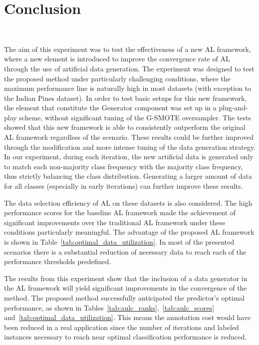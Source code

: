 \documentclass[preprint,12pt]{elsarticle}
\begin{document}
\section{Conclusion}~\label{sec:conclusion}

The aim of this experiment was to test the effectiveness of a new AL
framework, where a new element is introduced to improve the convergence rate
of AL through the use of artificial data generation. The experiment was
designed to test the proposed method under particularly challenging
conditions, where the maximum performance line is naturally high in most
datasets (with exception to the Indian Pines dataset). In order to test basic
setups for this new framework, the element that constitute the Generator
component was set up in a plug-and-play scheme, without significant tuning of
the G-SMOTE oversampler. The tests showed that this new framework is able to
consistently outperform the original AL framework regardless of the scenario.
These results could be further improved through the modification and more
intense tuning of the data generation strategy. In our experiment, during each
iteration, the new artificial data is generated only to match each
non-majority class frequency with the majority class frequency, thus strictly
balancing the class distribution. Generating a larger amount of data for all
classes (especially in early iterations) can further improve these results. 

The data selection efficiency of AL on these datasets is also considered. The
high performance scores for the baseline AL framework made the achievement of
significant improvements over the traditional AL framework under these
conditions particularly meaningful. The advantage of the proposed AL framework
is shown in Table~\ref{tab:optimal_data_utilization}. In most of the presented
scenarios there is a substantial reduction of necessary data to reach each of
the performance thresholds predefined. 

The results from this experiment show that the inclusion of a data generator
in the AL framework will yield significant improvements in the convergence of
the method. The proposed method successfully anticipated the predictor's
optimal performance, as shown in
Tables~\ref{tab:aulc_ranks},~\ref{tab:aulc_scores}
and~\ref{tab:optimal_data_utilization}. This means the annotation cost would have
been reduced in a real application since the number of iterations and labeled
instances necessary to reach near optimal classification performance is
reduced.
\end{document}
